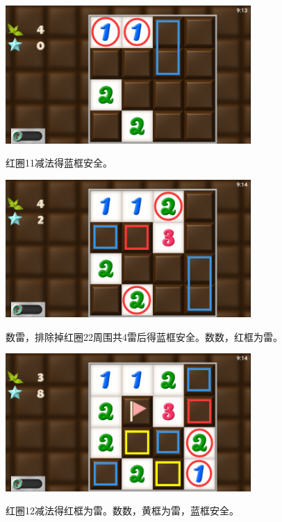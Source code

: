 \subsection{} %
\begin{center}
    \includegraphics[width=0.7\textwidth]{puzzle/118-1.png}
\end{center}
红圈11减法得蓝框安全。
\begin{center}
    \includegraphics[width=0.7\textwidth]{puzzle/118-2.png}
\end{center}
数雷，排除掉红圈22周围共4雷后得蓝框安全。数数，红框为雷。
\begin{center}
    \includegraphics[width=0.7\textwidth]{puzzle/118-3.png}
\end{center}
红圈12减法得红框为雷。数数，黄框为雷，蓝框安全。

